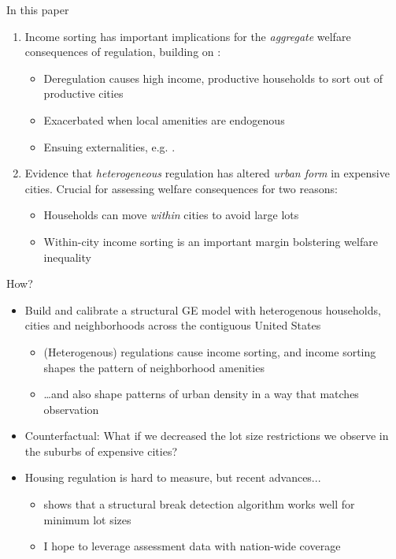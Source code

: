 \documentclass{beamer}
\theoremstyle{plain}
\begin{document}
\begin{frame}{In this paper}
	\begin{enumerate}
		\itemsep1em
		\color{black}
		\item Income sorting has important implications for the \textit{aggregate} welfare consequences of regulation, building on \cite{hseihmoretti}:
		\begin{itemize}
			\item Deregulation causes high income, productive households to sort out of productive cities
			\item Exacerbated when local amenities are endogenous
			\item Ensuing externalities, e.g. \cite{hamilton1976}. 
		\end{itemize} \pause
		\item  Evidence that \textit{heterogeneous} regulation has altered \textit{urban form} in expensive cities. Crucial for assessing welfare consequences for two reasons:
		\begin{itemize}
			\item Households can move \textit{within} cities to avoid large lots
			\item Within-city income sorting is an important margin bolstering welfare inequality
		\end{itemize}
	\end{enumerate} 
\end{frame}

\begin{frame}{How?}
	\begin{itemize}
		\color{black}
		\itemsep1em
		\item Build and calibrate a structural GE model with heterogenous households, cities and neighborhoods across the contiguous United States
		\begin{itemize}
			\item (Heterogenous) regulations cause income sorting, and income sorting shapes the pattern of neighborhood amenities
			\item \dots and also shape patterns of urban density in a way that matches observation
		\end{itemize} \pause
		\item Counterfactual: What if we decreased the lot size restrictions we observe in the suburbs of expensive cities? \pause
		\item Housing regulation is hard to measure, but recent advances...
		\begin{itemize}
			\item \cite{Song} shows that a structural break detection algorithm works well for minimum lot sizes
			\item I hope to leverage assessment data with nation-wide coverage
		\end{itemize}
	\end{itemize}
\end{frame}
\end{document}
